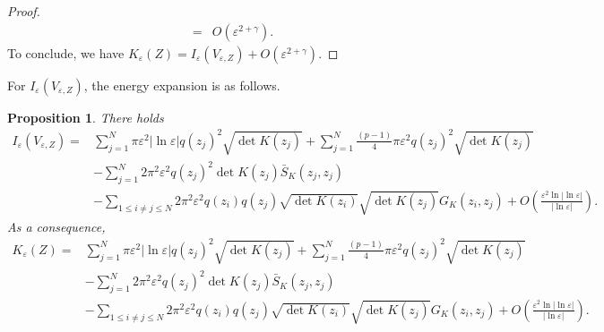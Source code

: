 \documentclass[12pt,reqno]{amsart}
\numberwithin{equation}{section}
\newtheorem{proposition}[theorem]{Proposition}
\theoremstyle{definition}
\theoremstyle{remark}
\begin{document}
\begin{proof}
\begin{equation*}
\begin{split}
=&O\left( \varepsilon^{2+\gamma}\right).
\end{split}
\end{equation*}
To conclude, we have $ K_{\varepsilon}(Z)=I_\varepsilon(V_{\varepsilon,Z})+O\left( \varepsilon^{2+\gamma}\right). $




\end{proof}
For $ I_\varepsilon(V_{\varepsilon,Z}) $,  the energy expansion is as follows.
\begin{proposition}\label{order of main term}
There holds
\begin{equation}\label{344}
\begin{split}
I_\varepsilon(V_{\varepsilon,Z})=&\sum_{j=1}^N \pi\varepsilon^2 |\ln \varepsilon|q(z_j)^2\sqrt{\det K(z_j)}+\sum_{j=1}^N\frac{(p-1)}{4}\pi\varepsilon^2q(z_j)^2\sqrt{\det K(z_j)}\\
&-\sum_{j=1}^N2\pi^2\varepsilon^2 q(z_j)^2  \det K(z_j)\bar{S}_K(z_j,z_j)\\
&-\sum_{1\leq i\neq j\leq N} 2\pi^2\varepsilon^2q(z_i)q(z_j)\sqrt{\det K(z_i)}\sqrt{\det K(z_j)} G_K(z_i,z_j)+O\left( \frac{\varepsilon^2 \ln|\ln\varepsilon| }{|\ln\varepsilon|}\right).
\end{split}
\end{equation}
As a consequence, 
\begin{equation}\label{345}
\begin{split}
K_\varepsilon(Z)=&\sum_{j=1}^N \pi\varepsilon^2 |\ln \varepsilon|q(z_j)^2\sqrt{\det K(z_j)}+\sum_{j=1}^N\frac{(p-1)}{4}\pi\varepsilon^2q(z_j)^2\sqrt{\det K(z_j)}\\
&-\sum_{j=1}^N2\pi^2\varepsilon^2 q(z_j)^2  \det K(z_j)\bar{S}_K(z_j,z_j)\\
&-\sum_{1\leq i\neq j\leq N} 2\pi^2\varepsilon^2q(z_i)q(z_j)\sqrt{\det K(z_i)}\sqrt{\det K(z_j)} G_K(z_i,z_j)+O\left( \frac{\varepsilon^2 \ln|\ln\varepsilon| }{|\ln\varepsilon|}\right).
\end{split}
\end{equation}
\end{proposition}
\end{document}
